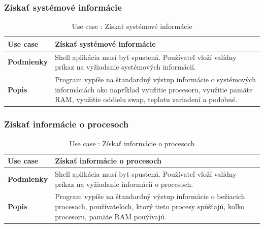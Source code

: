 \subsubsection{Získať systémové informácie}
\begin{center}
	\begin{table}[htbp]
		\begin{tabular}{|p{2.5cm}|p{14cm}|}
			\hline
			\textbf{Use case} & Získať systémové informácie \\ 
			\hline
			\textbf{Podmienky} & Shell aplikácia musí byť spustená. Používateľ vloží valídny príkaz na vyžiadanie systémových informácií. \\ 
			\hline
			\textbf{Popis} & Program vypíše na štandardný výstup informácie o systémových informáciách ako napríklad využitie procesoru, využitie pamäte RAM, využitie oddielu swap, teplotu zariadení a podobné.\\ 
			\hline
		\end{tabular}
		\label{table:1}
		\caption{Use case : Získať systémové informácie}
	\end{table}
\end{center}
\subsubsection{Získať informácie o procesoch}
\begin{center}
	\begin{table}[htbp]
		\begin{tabular}{|p{2.5cm}|p{14cm}|}
			\hline
			\textbf{Use case} & Získať informácie o procesoch \\ 
			\hline
			\textbf{Podmienky} & Shell aplikácia musí byť spustená. Používateľ vloží valídny príkaz na vyžiadanie informácií o procesoch. \\ 
			\hline
			\textbf{Popis} & Program vypíše na štandardný výstup informácie o bežiacich procesoch, používateľoch, ktorý tieto procesy spúšťajú, koľko procesoru, pamäte RAM pouýívajú.\\ 
			\hline
		\end{tabular}
		\label{table:1}
		\caption{Use case : Získať informácie o procesoch}
	\end{table}
\end{center}
\newpage
